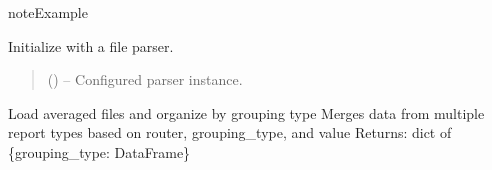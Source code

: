 \documentclass[a4paper,11pt,english,openany,oneside]{sphinxmanual}
\begin{document}
\begin{fulllineitems}
\begin{fulllineitems}
\begin{quote}
\begin{description}
\end{description}\end{quote}

\end{fulllineitems}


\begin{sphinxadmonition}{note}{Example}

\begin{sphinxVerbatim}[commandchars=\\\{\}]
  
  
  
\end{sphinxVerbatim}
\end{sphinxadmonition}

\begin{fulllineitems}
\label{\detokenize{modules/core:core.analysis.DataOrganizer.__init__}}
\pysigstartsignatures
\pysiglinewithargsret
{}
{}
{}
\pysigstopsignatures
\sphinxAtStartPar
Initialize with a file parser.
\begin{quote}\begin{description}
\sphinxAtStartPar
{} ({\hyperref[\detokenize{modules/core:core.analysis.SmartFileParser}]{}}) – Configured parser instance.

\end{description}\end{quote}

\end{fulllineitems}


\begin{fulllineitems}
\label{\detokenize{modules/core:core.analysis.DataOrganizer.load_averaged_files}}
\pysigstartsignatures
\pysiglinewithargsret
{}
{}
{}
\pysigstopsignatures
\sphinxAtStartPar
Load averaged files and organize by grouping type
Merges data from multiple report types based on router, grouping\_type, and value
Returns: dict of \{grouping\_type: DataFrame\}


\end{fulllineitems}
\end{fulllineitems}
\end{document}
